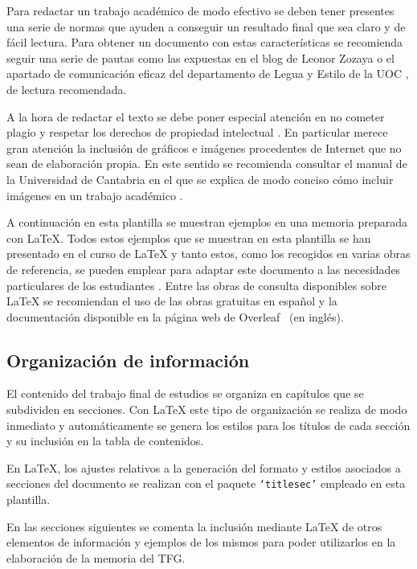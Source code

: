 Para redactar un trabajo académico de modo efectivo se deben tener presentes una serie de normas que ayuden a conseguir un resultado final que sea claro y de fácil lectura. Para obtener un documento con estas características se recomienda seguir una serie de pautas como las expuestas en el blog de Leonor Zozaya \cite{zozaya17} o el apartado de comunicación eficaz del departamento de Legua y Estilo de la UOC \cite{uoc}, de lectura recomendada.

A la hora de redactar el texto se debe poner especial atención en no cometer plagio y respetar los derechos de propiedad intelectual \cite{uc3m21}. En particular merece gran atención la inclusión de gráficos e imágenes procedentes de Internet que no sean de elaboración propia. En este sentido se recomienda consultar el manual de la Universidad de Cantabria en el que se explica de modo conciso cómo incluir imágenes en un trabajo académico \cite{unican18}.

A continuación en esta plantilla se muestran ejemplos en una memoria preparada con \LaTeX{}. Todos estos ejemplos que se muestran en esta plantilla se han presentado en el curso de \LaTeX{} \cite{salido10} y tanto estos, como los recogidos en varias obras de referencia, se pueden emplear para adaptar este documento a las necesidades particulares de los estudiantes \cite{lamport94,grat99,cascales03,mittelbach04,grat07,goos07,wikibookLaTex10}. Entre las obras de consulta disponibles sobre \LaTeX{} se recomiendan el uso de las obras gratuitas en español \cite{oetiker14,borbon21} y la documentación disponible en la página web de Overleaf~\cite{overleaf21} (en inglés).




\subsection{Organización de información}
El contenido del trabajo final de estudios se organiza en capítulos que se subdividen en secciones. Con \LaTeX{} este tipo de organización se realiza de modo inmediato y automáticamente se genera los estilos para los títulos de cada sección y su inclusión en la tabla de contenidos.

En \LaTeX{}, los ajustes relativos a la generación del formato y estilos asociados a secciones del documento se realizan con el paquete \texttt{`titlesec'} empleado en esta plantilla.

En las secciones siguientes se comenta la inclusión mediante \LaTeX{} de otros elementos de información y ejemplos de los mismos para poder utilizarlos en la elaboración de la memoria del TFG.




